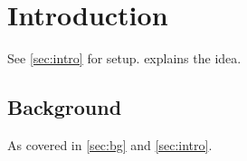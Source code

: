 \section{Introduction \label{sec:intro}}

See \cref{sec:intro} for setup.  explains the idea.

\subsection{Background \label{sec:bg}}

As covered in \cref{sec:bg} and \cref{sec:intro}.


